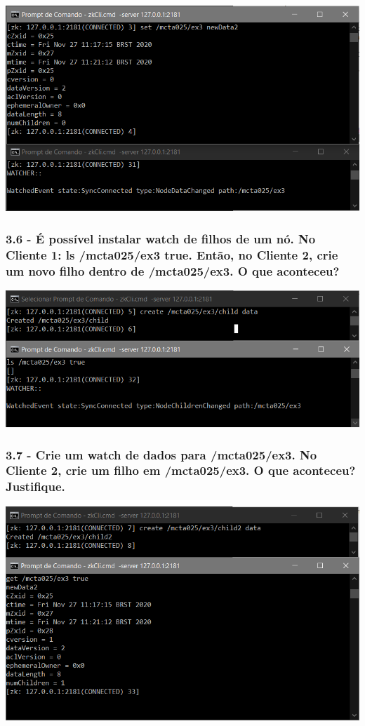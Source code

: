 \includegraphics{pratica3/prints/roteiro 3.5.PNG}

\subsubsection{3.6 - É possível instalar watch de filhos de um nó. No Cliente 1: ls
/mcta025/ex3 true. Então, no Cliente 2, crie um novo filho dentro de /mcta025/ex3. O que aconteceu?}

\includegraphics{pratica3/prints/roteiro 3.6.PNG}

\subsubsection{3.7 - Crie um watch de dados para /mcta025/ex3. No Cliente 2, crie um
filho em /mcta025/ex3. O que aconteceu? Justifique.}

\includegraphics{pratica3/prints/roteiro 3.7.PNG}

